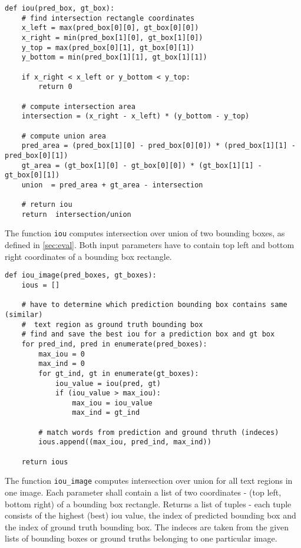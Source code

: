 \begin{lstlisting}[caption=iou]
def iou(pred_box, gt_box):
    # find intersection rectangle coordinates
    x_left = max(pred_box[0][0], gt_box[0][0])
    x_right = min(pred_box[1][0], gt_box[1][0])
    y_top = max(pred_box[0][1], gt_box[0][1])
    y_bottom = min(pred_box[1][1], gt_box[1][1])

    if x_right < x_left or y_bottom < y_top:
        return 0
    
    # compute intersection area
    intersection = (x_right - x_left) * (y_bottom - y_top)

    # compute union area
    pred_area = (pred_box[1][0] - pred_box[0][0]) * (pred_box[1][1] - pred_box[0][1]) 
    gt_area = (gt_box[1][0] - gt_box[0][0]) * (gt_box[1][1] - gt_box[0][1]) 
    union  = pred_area + gt_area - intersection

    # return iou
    return  intersection/union

\end{lstlisting}

The function \lstinline{iou} computes intersection over union of two bounding boxes, as defined in \ref*{sec:eval}. Both input parameters have to contain top left and bottom right coordinates of a bounding box rectangle.

\begin{lstlisting}[caption=iou\_image]
def iou_image(pred_boxes, gt_boxes):
    ious = []

    # have to determine which prediction bounding box contains same (similar) 
    #  text region as ground truth bounding box
    # find and save the best iou for a prediction box and gt box
    for pred_ind, pred in enumerate(pred_boxes):
        max_iou = 0
        max_ind = 0
        for gt_ind, gt in enumerate(gt_boxes):
            iou_value = iou(pred, gt)
            if (iou_value > max_iou):
                max_iou = iou_value
                max_ind = gt_ind

        # match words from prediction and ground thruth (indeces)     
        ious.append((max_iou, pred_ind, max_ind))

    return ious

\end{lstlisting}

The function \lstinline{iou_image} computes intersection over union for all text regions in one image.
Each parameter shall contain a list of two coordinates - (top left, bottom right) of a bounding box rectangle.
Returns a list of tuples - each tuple consists of the highest (best) iou value, the index of predicted bounding box and  the index of ground truth bounding box. The indeces are taken from the given lists of bounding boxes or ground truths belonging to one particular image.



